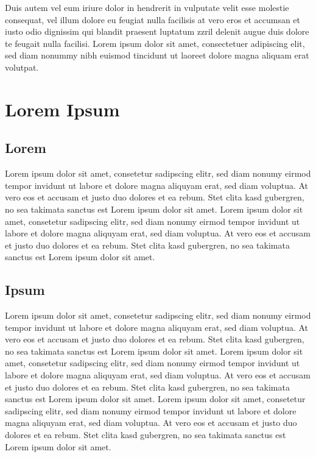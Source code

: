 \documentclass[12pt]{scrartcl}
\begin{document}
Duis autem vel eum iriure dolor in hendrerit in vulputate velit esse molestie
consequat, vel illum dolore eu feugiat nulla facilisis at vero eros et accumsan
et iusto odio dignissim qui blandit praesent luptatum zzril delenit augue duis
dolore te feugait nulla facilisi. Lorem ipsum dolor sit amet, consectetuer
adipiscing elit, sed diam nonummy nibh euismod tincidunt ut laoreet dolore
magna aliquam erat volutpat.

\newpage

\section{Lorem Ipsum}

\subsection{Lorem}

Lorem ipsum dolor sit amet, consetetur sadipscing elitr, sed diam nonumy eirmod
tempor invidunt ut labore et dolore magna aliquyam erat, sed diam voluptua. At
vero eos et accusam et justo duo dolores et ea rebum. Stet clita kasd
gubergren, no sea takimata sanctus est Lorem ipsum dolor sit amet. Lorem ipsum
dolor sit amet, consetetur sadipscing elitr, sed diam nonumy eirmod tempor
invidunt ut labore et dolore magna aliquyam erat, sed diam voluptua. At vero
eos et accusam et justo duo dolores et ea rebum. Stet clita kasd gubergren, no
sea takimata sanctus est Lorem ipsum dolor sit amet.

\subsection{Ipsum}

Lorem ipsum dolor sit amet, consetetur sadipscing elitr, sed diam nonumy eirmod
tempor invidunt ut labore et dolore magna aliquyam erat, sed diam voluptua. At
vero eos et accusam et justo duo dolores et ea rebum. Stet clita kasd
gubergren, no sea takimata sanctus est Lorem ipsum dolor sit amet. Lorem ipsum
dolor sit amet, consetetur sadipscing elitr, sed diam nonumy eirmod tempor
invidunt ut labore et dolore magna aliquyam erat, sed diam voluptua. At vero
eos et accusam et justo duo dolores et ea rebum. Stet clita kasd gubergren, no
sea takimata sanctus est Lorem ipsum dolor sit amet. Lorem ipsum dolor sit
amet, consetetur sadipscing elitr, sed diam nonumy eirmod tempor invidunt ut
labore et dolore magna aliquyam erat, sed diam voluptua. At vero eos et accusam
et justo duo dolores et ea rebum. Stet clita kasd gubergren, no sea takimata
sanctus est Lorem ipsum dolor sit amet.
\end{document}
